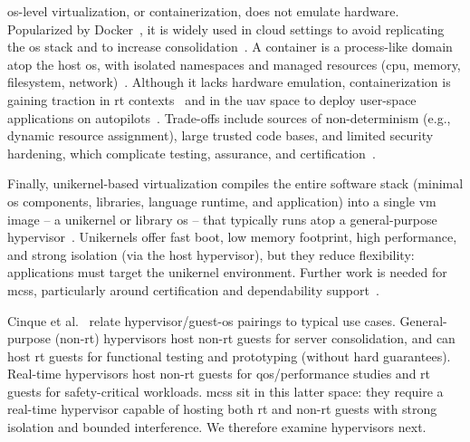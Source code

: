 \gls{os}-level virtualization, or containerization, does not emulate
hardware. Popularized by
Docker~\cite{sollfrank_evaluating_2021,kumar_economically_2016}, it is widely
used in cloud settings to avoid replicating the \gls{os} stack and to increase
consolidation~\cite{cinque2022virtualizing}. A container is a process-like
domain atop the host \gls{os}, with isolated namespaces and managed resources
(\gls{cpu}, memory, filesystem, network)~\cite{cinque2022virtualizing}. Although
it lacks hardware emulation, containerization is gaining traction in \gls{rt}
contexts~\cite{xilinxRunX,struhar2020real} and in the \gls{uav} space to deploy
user-space applications on autopilots~\cite{auterion-sw-services}. Trade-offs
include sources of non-determinism (e.g., dynamic resource assignment), large
trusted code bases, and limited security hardening, which complicate testing,
assurance, and certification~\cite{cinque2022virtualizing}.

Finally, unikernel-based virtualization compiles the entire software stack
(minimal \gls{os} components, libraries, language runtime, and application) into
a single \gls{vm} image -- a unikernel or library \gls{os} -- that typically runs atop
a general-purpose hypervisor~\cite{cinque2022virtualizing}. Unikernels offer
fast boot, low memory footprint, high performance, and strong isolation (via the
host hypervisor), but they reduce flexibility: applications must target the
unikernel environment. Further work is needed for \glspl{mcs}, particularly
around certification and dependability support~\cite{cinque2022virtualizing}.

Cinque et al.~\cite{cinque2022virtualizing} relate hypervisor/guest-\gls{os}
pairings to typical use cases. General-purpose (non-\gls{rt}) hypervisors host
non-\gls{rt} guests for server consolidation, and can host \gls{rt} guests for
functional testing and prototyping (without hard guarantees). Real-time
hypervisors host non-\gls{rt} guests for \gls{qos}/performance studies and
\gls{rt} guests for safety-critical workloads. \glspl{mcs} sit in this latter
space: they require a real-time hypervisor capable of hosting both \gls{rt} and
non-\gls{rt} guests with strong isolation and bounded interference. We therefore
examine hypervisors next.

